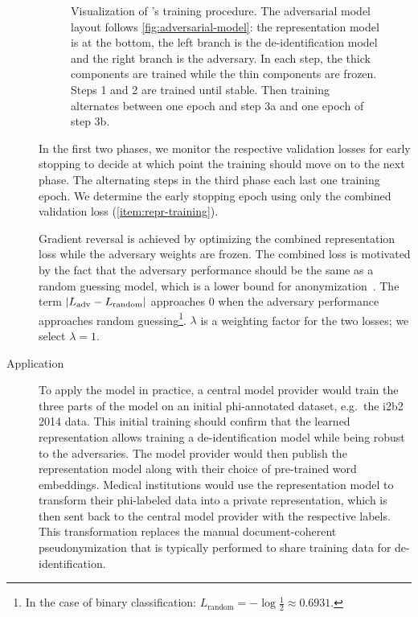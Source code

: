 \begin{description}
    \begin{figure}
        \centering
        
        \caption[Adversarial training procedure]{%
            Visualization of \citeauthor{feutry2018learning}'s training procedure.
            The adversarial model layout follows \cref{fig:adversarial-model}: the representation model is at the bottom, the left branch is the de-identification model and the right branch is the adversary.
            In each step, the thick components are trained while the thin components are frozen.
            Steps 1 and 2 are trained until stable.
            Then training alternates between one epoch and step 3a and one epoch of step 3b.
        }\label{fig:feutry-training}
    \end{figure}
    
    In the first two phases, we monitor the respective validation losses for early stopping to decide at which point the training should move on to the next phase.
    The alternating steps in the third phase each last one training epoch.
    We determine the early stopping epoch using only the combined validation loss (\cref{item:repr-training}).
    
    Gradient reversal is achieved by optimizing the combined representation loss while the adversary weights are frozen.
    The combined loss is motivated by the fact that the adversary performance should be the same as a random guessing model, which is a lower bound for anonymization~\citep{feutry2018learning}.
    The term $\lvert L_{\text{adv}} - L_{\text{random}}\rvert$ approaches $0$ when the adversary performance approaches random guessing\footnote{In the case of binary classification: $L_{\text{random}} = -\log \frac{1}{2} \approx 0.6931$.}.
    $\lambda$ is a weighting factor for the two losses; we select $\lambda=1$.
    
    \item[Application]
    To apply the model in practice, a central model provider would train the three parts of the model on an initial \ac{phi}-annotated dataset, e.g.\ the i2b2 2014 data.
    This initial training should confirm that the learned representation allows training a de-identification model while being robust to the adversaries.
    The model provider would then publish the representation model along with their choice of pre-trained word embeddings.
    Medical institutions would use the representation model to transform their \ac{phi}-labeled data into a private representation, which is then sent back to the central model provider with the respective labels.
    This transformation replaces the manual document-coherent pseudonymization that is typically performed to share training data for de-identification.
    

\end{description}
